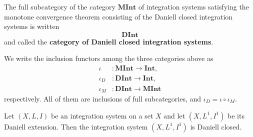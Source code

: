 \begin{definition}
  The full subcategory of the category $\mathbf{MInt}$ of integration systems
  satisfying the monotone convergence theorem consisting of the Daniell closed
  integration systems is written
  \[
    \mathbf{DInt}
  \]
  and called the \textbf{category of Daniell closed integration systems}.
\end{definition}

\begin{definition}\label{def:inclusion-functors}
  We write the inclusion functors among the three categories above as
  \begin{align*}
    \iota&:\mathbf{MInt}\to\mathbf{Int},\\
    \iota_{D}&:\mathbf{DInt}\to\mathbf{Int},\\
    \iota_M&:\mathbf{DInt}\to\mathbf{MInt}
  \end{align*}
  respectively. All of them are inclusions of full subcategories, and
  $\iota_{D}=\iota\circ\iota_M$.
\end{definition}

\begin{lemma}\label{lem:daniell-ext-is-complete}
  Let $(X,L,I)$ be an integration system on a set $X$ and let
  $(X,L^1,I^1)$ be its Daniell extension.
  Then the integration system $(X,L^1,I^1)$ is Daniell closed.
\end{lemma}

